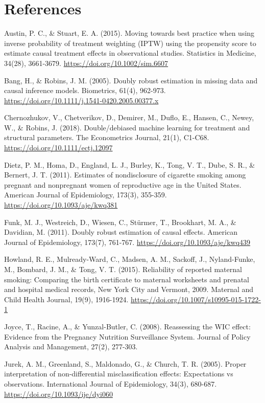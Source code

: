 \section*{References}
{\small\setlength{\parindent}{-0.25in}\setlength{\leftskip}{0.25in}\setlength{\parskip}{3pt}
Austin, P. C., \& Stuart, E. A. (2015). Moving towards best practice when using inverse probability of treatment weighting (IPTW) using the propensity score to estimate causal treatment effects in observational studies. Statistics in Medicine, 34(28), 3661-3679. \url{https://doi.org/10.1002/sim.6607}

Bang, H., \& Robins, J. M. (2005). Doubly robust estimation in missing data and causal inference models. Biometrics, 61(4), 962-973. \url{https://doi.org/10.1111/j.1541-0420.2005.00377.x}

Chernozhukov, V., Chetverikov, D., Demirer, M., Duflo, E., Hansen, C., Newey, W., \& Robins, J. (2018). Double/debiased machine learning for treatment and structural parameters. The Econometrics Journal, 21(1), C1-C68. \url{https://doi.org/10.1111/ectj.12097}

Dietz, P. M., Homa, D., England, L. J., Burley, K., Tong, V. T., Dube, S. R., \& Bernert, J. T. (2011). Estimates of nondisclosure of cigarette smoking among pregnant and nonpregnant women of reproductive age in the United States. American Journal of Epidemiology, 173(3), 355-359. \url{https://doi.org/10.1093/aje/kwq381}

Funk, M. J., Westreich, D., Wiesen, C., Stürmer, T., Brookhart, M. A., \& Davidian, M. (2011). Doubly robust estimation of causal effects. American Journal of Epidemiology, 173(7), 761-767. \url{https://doi.org/10.1093/aje/kwq439}

Howland, R. E., Mulready-Ward, C., Madsen, A. M., Sackoff, J., Nyland-Funke, M., Bombard, J. M., \& Tong, V. T. (2015). Reliability of reported maternal smoking: Comparing the birth certificate to maternal worksheets and prenatal and hospital medical records, New York City and Vermont, 2009. Maternal and Child Health Journal, 19(9), 1916-1924. \url{https://doi.org/10.1007/s10995-015-1722-1}

Joyce, T., Racine, A., \& Yunzal-Butler, C. (2008). Reassessing the WIC effect: Evidence from the Pregnancy Nutrition Surveillance System. Journal of Policy Analysis and Management, 27(2), 277-303.

Jurek, A. M., Greenland, S., Maldonado, G., \& Church, T. R. (2005). Proper interpretation of non-differential misclassification effects: Expectations vs observations. International Journal of Epidemiology, 34(3), 680-687. \url{https://doi.org/10.1093/ije/dyi060}

}
